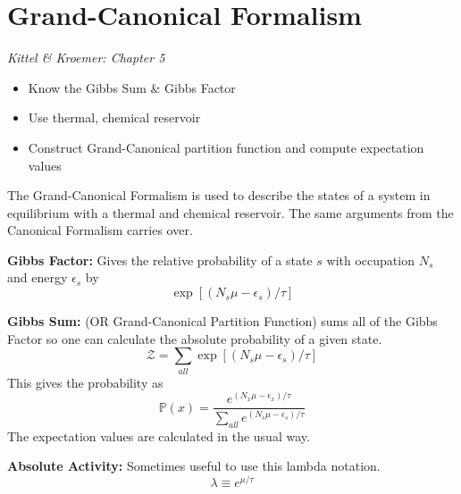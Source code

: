 \section{Grand-Canonical Formalism}

\emph{Kittel \& Kroemer: Chapter 5}
\begin{itemize}
    \item Know the Gibbs Sum \& Gibbs Factor
    \item Use thermal, chemical reservoir
    \item Construct Grand-Canonical partition function and compute expectation values
\end{itemize}

The Grand-Canonical Formalism is used to describe the states of a system in equilibrium with a thermal and chemical reservoir. The same arguments from the Canonical Formalism carries over.

\textbf{Gibbs Factor:} Gives the relative probability of a state $s$ with occupation $N_s$ and energy $\epsilon_s$ by
\[
\exp{[(N_s\mu-\epsilon_s)/\tau]}
\]

\textbf{Gibbs Sum:} (OR Grand-Canonical Partition Function) sums all of the Gibbs Factor so one can calculate the absolute probability of a given state.
\[
\mathcal{Z} = \sum_{all} \exp{[(N_s\mu-\epsilon_s)/\tau]}
\]
This gives the probability as
\[
\mathbb{P}(x) = \frac{e^{(N_x\mu-\epsilon_x)/\tau}}{\sum_{all} e^{(N_s\mu-\epsilon_s)/\tau}}
\]
The expectation values are calculated in the usual way.

\textbf{Absolute Activity:} Sometimes useful to use this lambda notation.
\[
\lambda \equiv e^{\mu/\tau}
\]